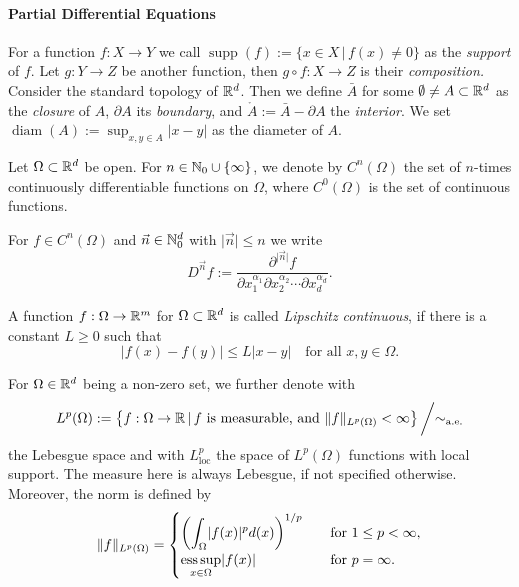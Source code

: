 \paragraph{Partial Differential Equations}

For a function $f: X \to Y$ we call $\operatorname{supp}(f) := \{ x \in X \, \vert \, f(x) \neq 0 \}$
as the \emph{support} of $f$. Let $g: Y \to Z$ be another function, then $g \circ f: X \to Z$ is their \emph{composition.}
Consider the standard topology of $\mathbb{R}^d$. Then we define $\bar{A}$ for some $\emptyset \neq A \subset \mathbb{R}^d$ as the \emph{closure} of $A$,
$\partial A$ its \emph{boundary}, and $\mathring{A}:=\bar{A} - \partial A$ the \emph{interior}. We set $\operatorname{diam}(A) := \sup_{x, y \in A} \vert x-y \vert$
as the diameter of $A$. 

Let $\Omega \subset \mathbb{R}^d$ be open. For $n \in \mathbb{N}_0 \cup \{ \infty \}$, we denote by $C^n(\Omega)$ the set
of $n$-times continuously differentiable functions on $\Omega$, where $C^0(\Omega)$ is the set of continuous functions.

For $f \in C^n(\Omega)$ and ${\vec{n}} \in \mathbb{N}_0^d$ with $\vert {\vec{n}} \vert \leq n$ we write
\begin{equation*}
    D^{\vec{n}} f := \frac{\partial^{\vert {\vec{n}} \vert}f}{\partial x_1^{\alpha_1} \partial x_2^{\alpha_2} \cdots
    \partial x_d^{\alpha_d}}.
\end{equation*}

A function $f: \Omega \to \mathbb{R}^m$ for $\Omega \subset \mathbb{R}^d$ is called \emph{Lipschitz continuous}, if there is a constant
$L \geq 0$ such that
\begin{equation*}
    \vert f(x) - f(y) \vert \leq L \vert x - y \vert \quad \text{for all }x, y \in \Omega.
\end{equation*}

For $\Omega \in \mathbb{R}^d$ being a non-zero set, we further denote with 
\begin{equation*}
    L^p(\Omega) := \left\{f: \Omega \to \mathbb{R} \, \vert \, f \text{ is measurable, and } 
    \lVert f \rVert_{L^p(\Omega)} < \infty \right\} \bigg/ {\sim_\text{a.e.}}
\end{equation*}
the Lebesgue space and with $L^p_\text{loc}$ the space of $L^p(\Omega)$ functions with local support. 
The measure here is always Lebesgue, if not specified otherwise.
Moreover, the norm is defined by
\begin{equation*}
    \lVert f \rVert_{L^p(\Omega)} = 
    \begin{cases}
        \displaystyle
        \left(\int_\Omega \lvert f(x) \rvert^p d(x) \right)^{1/p} \quad &\text{for } 1 \leq p < \infty, \\
        \displaystyle
        \underset{x \in \Omega}{\operatorname{ess \, sup}} \lvert f(x) \rvert \quad &\text{for } p = \infty.
    \end{cases}
\end{equation*}

